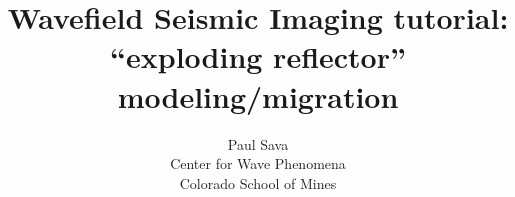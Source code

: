 

\author{Paul Sava \\ Center for Wave Phenomena \\ Colorado School of Mines}
\title{Wavefield Seismic Imaging tutorial: \\
  ``exploding reflector'' modeling/migration}
\maketitle


